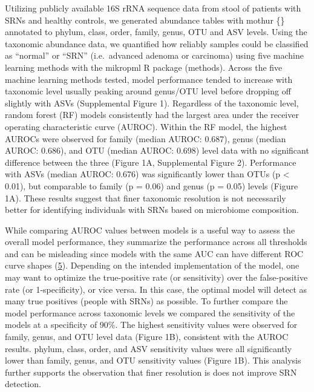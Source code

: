 \documentclass[
]{article}
\begin{document}
Utilizing publicly available 16S rRNA sequence data from stool of
patients with SRNs and healthy controls, we generated abundance tables
with mothur \{\} annotated to phylum, class, order, family, genus, OTU
and ASV levels. Using the taxonomic abundance data, we quantified how
reliably samples could be classified as ``normal'' or ``SRN''
(i.e.~advanced adenoma or carcinoma) using five machine learning methods
with the mikropml R package (methods). Across the five machine learning
methods tested, model performance tended to increase with taxonomic
level usually peaking around genus/OTU level before dropping off
slightly with ASVs (Supplemental Figure 1). Regardless of the taxonomic
level, random forest (RF) models consistently had the largest area under
the receiver operating characteristic curve (AUROC). Within the RF
model, the highest AUROCs were observed for family (median AUROC:
0.687), genus (median AUROC: 0.686), and OTU (median AUROC: 0.698) level
data with no significant difference between the three (Figure 1A,
Supplemental Figure 2). Performance with ASVs (median AUROC: 0.676) was
significantly lower than OTUs (p \textless{} 0.01), but comparable to
family (p = 0.06) and genus (p = 0.05) levels (Figure 1A). These results
suggest that finer taxonomic resolution is not necessarily better for
identifying individuals with SRNs based on microbiome composition.

While comparing AUROC values between models is a useful way to assess
the overall model performance, they summarize the performance across all
thresholds and can be misleading since models with the same AUC can have
different ROC curve shapes (\protect\hyperlink{ref-lobo2008}{5}).
Depending on the intended implementation of the model, one may want to
optimize the true-positive rate (or sensitivity) over the false-positive
rate (or 1-specificity), or vice versa. In this case, the optimal model
will detect as many true positives (people with SRNs) as possible. To
further compare the model performance across taxonomic levels we
compared the sensitivity of the models at a specificity of 90\%. The
highest sensitivity values were observed for family, genus, and OTU
level data (Figure 1B), consistent with the AUROC results. phylum,
class, order, and ASV sensitivity values were all significantly lower
than family, genus, and OTU sensitivity values (Figure 1B). This
analysis further supports the observation that finer resolution is does
not improve SRN detection.
\end{document}
